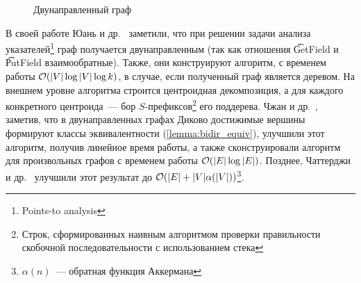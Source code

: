 \begin{figure}[h]
\begin{minipage}[h]{0.5\linewidth}
    \caption{Двунаправленный граф}
    \label{img:bigraph}
  \end{minipage}
\end{figure}

В своей работе Юань и др.~\cite{Yuan09} заметили, что при решении задачи анализа указателей\footnote{Points-to analysis} граф получается двунаправленным (так как отношения \t{GetField} и \t{PutField} взаимообратные). Также, они конструируют алгоритм, с временем работы $\mathcal{O}(|V| \log |V| \log k)$, в случае, если полученный граф является деревом. На внешнем уровне алгоритма строится центроидная декомпозиция, а для каждого конкретного центроида~--- бор $S$-префиксов\footnote{Строк, сформированных наивным алгоритмом проверки правильности скобочной последовательности с использованием стека} его поддерева. Чжан и др.~\cite{Zhang13}, заметив, что в двунаправленных графах Диково достижимые вершины формируют классы эквивалентности (\ref{lemma:bidir_equiv}), улучшили этот алгоритм, получив линейное время работы, а также сконструировали алгоритм для произвольных графов с временем работы $\mathcal{O}(|E| \log |E|)$. Позднее, Чаттерджи и др.~\cite{Chatterjee17} улучшили этот результат до $\mathcal{O}(|E| + |V| \alpha(|V|))$\footnote{$\alpha(n)$~--- обратная функция Аккермана}.


